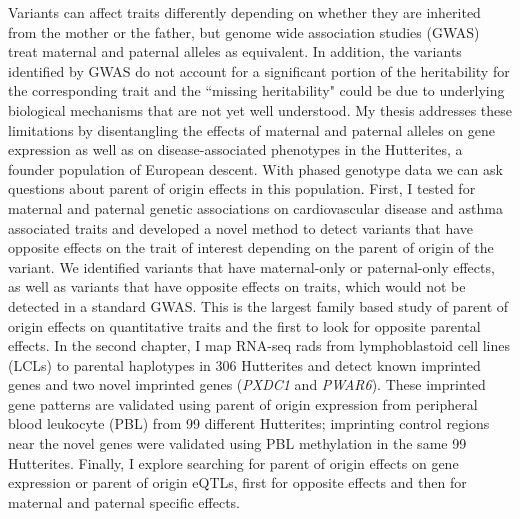 \abstract

Variants can affect traits differently depending on whether they are inherited from the mother or the father, but genome wide association studies (GWAS) treat maternal and paternal alleles as equivalent. In addition, the variants identified by GWAS do not account for a significant portion of the heritability for the corresponding trait and the ``missing heritability" could be due to underlying biological mechanisms that are not yet well understood. My thesis addresses these limitations by disentangling the effects of maternal and paternal alleles on gene expression as well as on disease-associated phenotypes in the Hutterites, a founder population of European descent. With phased genotype data we can ask questions about parent of origin effects in this population. First, I tested for maternal and paternal genetic associations on cardiovascular disease and asthma associated traits and developed a novel method to detect variants that have opposite effects on the trait of interest depending on the parent of origin of the variant. We identified variants that have maternal-only or paternal-only effects, as well as variants that have opposite effects on traits, which would not be detected in a standard GWAS. This is the largest family based study of parent of origin effects on quantitative traits and the first to look for opposite parental effects. In the second chapter, I map RNA-seq rads from lymphoblastoid cell lines (LCLs) to parental haplotypes in 306  Hutterites and detect known imprinted genes and two novel imprinted genes (\emph{PXDC1} and \emph{PWAR6}). These imprinted gene patterns are validated using parent of origin expression from peripheral blood leukocyte (PBL)  from 99 different Hutterites; imprinting control regions near the novel genes were validated using PBL methylation in the same 99 Hutterites. Finally, I explore searching for parent of origin effects on gene expression or parent of origin eQTLs, first for opposite effects and then for maternal and paternal specific effects. 
